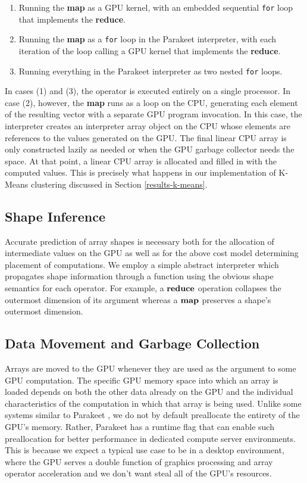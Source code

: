 \documentclass[10pt,twocolumn]{article}
\begin{document}
\begin{enumerate}
\item Running the \textbf{map} as a GPU kernel, with an embedded sequential \texttt{for} loop that implements the \textbf{reduce}.
\item Running the \textbf{map} as a \texttt{for} loop in the Parakeet interpreter, with each iteration of the loop calling a GPU kernel that implements the \textbf{reduce}.
\item Running everything in the Parakeet interpreter as two nested \texttt{for} loops.
\end{enumerate}

In cases (1) and (3), the operator is executed entirely on a single processor.  In case (2), however, the \textbf{map} runs as a loop on the CPU, generating each element of the resulting vector with a separate GPU program invocation.  In this case, the interpreter creates an interpreter array object on the CPU whose elements are references to the values generated on the GPU.  The final linear CPU array is only constructed lazily as needed or when the GPU garbage collector needs the space.  At that point, a linear CPU array is allocated and filled in with the computed values.  This is precisely what happens in our implementation of K-Means clustering discussed in Section \ref{results-k-means}.

\subsection{Shape Inference}
\label{shapeinference}
Accurate prediction of array shapes is necessary both for the allocation of intermediate values on the GPU as well as for the above cost model determining placement of computations. We employ a simple abstract interpreter which propagates shape information through a function using the obvious shape semantics for each operator. For example, a $\mbox{\textbf{reduce}}$ operation collapses the outermost dimension of its argument whereas a $\mbox{\textbf{map}}$ preserves a shape's outermost dimension.

\subsection{Data Movement and Garbage Collection} 
Arrays are moved to the GPU whenever they are used as the argument to some GPU computation. The specific GPU memory space into which an array is loaded depends on both the other data already on the GPU and the individual characteristics of the computation in which that array is being used.
Unlike some systems similar to Parakeet \cite{Chaf11}, we do not by default preallocate the entirety of the GPU's memory.  Rather, Parakeet has a runtime flag that can enable such preallocation for better performance in dedicated compute server environments.  This is because we expect a typical use case to be in a desktop environment, where the GPU serves a double function of graphics processing and array operator acceleration and we don't want steal all of the GPU's resources.
\end{document}
